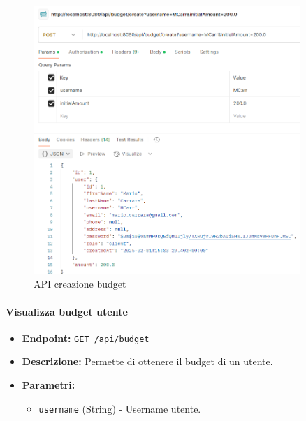 \begin{figure}[H]
    \centering
    \includegraphics[width=0.9\textwidth]{images/CreateBudgetAPI.png}
    \caption{API creazione budget}
    \label{fig:CreateBudgetAPI}
\end{figure}

\paragraph{Visualizza budget utente} 

\begin{itemize}
    \item \textbf{Endpoint:} \texttt{GET /api/budget}
    \item \textbf{Descrizione:} Permette di ottenere il budget di un utente.
    \item \textbf{Parametri:}
    \begin{itemize}
        \item \texttt{username} (String) - Username utente.
    \end{itemize}
\end{itemize}

